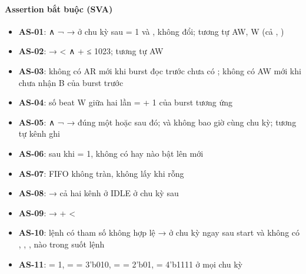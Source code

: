 \documentclass[10pt,a4paper]{article}
\begin{document}
\paragraph{Assertion bắt buộc (SVA)}
\begin{itemize}
\item \textbf{AS-01}:  ∧ ¬ → ở chu kỳ sau  = 1 và ,  không đổi; tương tự AW, W (cả , )
\item \textbf{AS-02}:  →  <  ∧  +  ≤ 1023; tương tự AW
\item \textbf{AS-03}: không có AR mới khi burst đọc trước chưa có ; không có AW mới khi chưa nhận B của burst trước
\item \textbf{AS-04}: số beat W giữa hai lần  =  + 1 của burst tương ứng
\item \textbf{AS-05}:  ∧ ¬ → đúng một  hoặc  sau đó;  và  không bao giờ cùng chu kỳ; tương tự kênh ghi
\item \textbf{AS-06}: sau khi  = 1, không có  hay  nào bật lên mới
\item \textbf{AS-07}: FIFO không tràn, không lấy khi rỗng
\item \textbf{AS-08}:  → cả hai kênh ở IDLE ở chu kỳ sau
\item \textbf{AS-09}:  →  +  < 
\item \textbf{AS-10}: lệnh có tham số không hợp lệ →  ở chu kỳ ngay sau start và không có , , ,  nào trong suốt lệnh
\item \textbf{AS-11}:  = 1,  =  = 3'b010,  =  = 2'b01,  = 4'b1111 ở mọi chu kỳ
\end{itemize}
\end{document}
